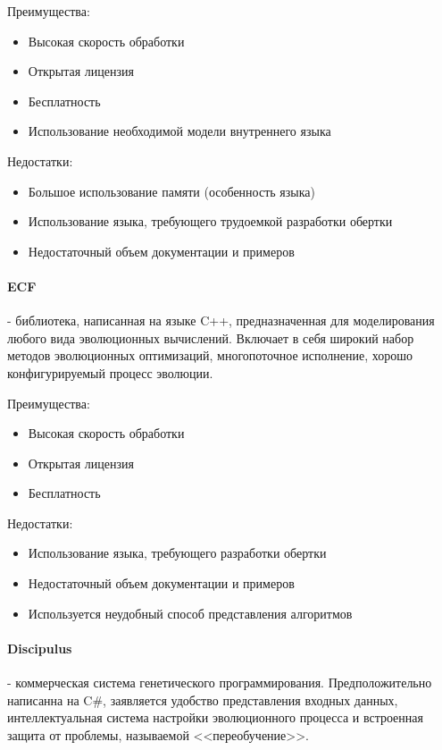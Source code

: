 \documentclass[russian,utf8,emptystyle]{eskdtext}
\begin{document}
Преимущества:
\begin{itemize}
\item Высокая скорость обработки
\item Открытая лицензия
\item Бесплатность
\item Использование необходимой модели внутреннего языка
\end{itemize}

Недостатки:
\begin{itemize}
\item Большое использование памяти (особенность языка)
\item Использование языка, требующего трудоемкой разработки обертки 
\item Недостаточный объем документации и примеров
\end{itemize}

\paragraph{ECF} - библиотека, написанная на языке C++, предназначенная для моделирования любого вида эволюционных вычислений. Включает в себя широкий набор методов эволюционных оптимизаций, многопоточное исполнение, хорошо конфигурируемый процесс эволюции.

Преимущества:
\begin{itemize}
\item Высокая скорость обработки
\item Открытая лицензия
\item Бесплатность
\end{itemize}

Недостатки:
\begin{itemize}
\item Использование языка, требующего разработки обертки 
\item Недостаточный объем документации и примеров
\item Используется неудобный способ представления алгоритмов
\end{itemize}

\paragraph{Discipulus} - коммерческая система генетического программирования. Предположительно написанна на C\#, заявляется удобство представления входных данных, интеллектуальная система настройки эволюционного процесса и встроенная защита от проблемы, называемой <<переобучение>>.
\end{document}
